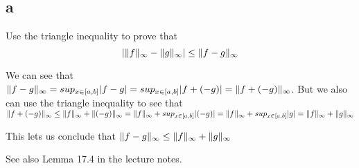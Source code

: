 \documentclass[]{article}
\DeclarePairedDelimiter\norm{\lVert}{\rVert}
\begin{document}
		\subsection*{a}
		\begin{em}
			Use the triangle inequality to prove that \[| \norm{f}_\infty - \norm{g}_\infty | \leq \norm{f - g}_\infty \]
		\end{em}



			We can see that $\norm{f - g}_\infty = sup_{x \in [a, b]}|f - g| = sup_{x \in [a, b]}|f + (- g)| = \norm{f + (-g)}_\infty$. But we also can use the triangle inequality to see that $\norm{f + (-g)}_\infty \leq \norm{f}_\infty + \norm{(-g)}_\infty = \norm{f}_\infty + sup_{x \in [a, b]}|(-g)| = \norm{f}_\infty + sup_{x \in [a, b]}|g| = \norm{f}_\infty + \norm{g}_\infty$ 

			This lets us conclude that $\norm{f - g}_\infty \leq \norm{f}_\infty + \norm{g}_\infty$





			See also Lemma 17.4 in the lecture notes. 
\end{document}
